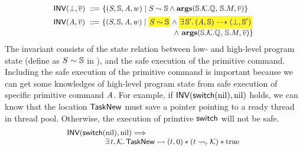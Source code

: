 \[
    \small
    \begin{array}{l}
        \INV{(\primdone, \args{\val})} \ \define \ 
        \{
        (\state, \hpstate, \primcom, \word) \sepline
        \stateRel{\state}{\hpstate}
        \land 
        \arguments(\hpstate.\hthrdlocalst.\hRstate, \,  
        \hpstate.\Mem, \args{\val})
        \} \\
        \\[-8pt]
        \INV{(\primcom, \args{\val})} \ \define \ 
        \{
            (\state, \hpstate, \primcom, \word) \sepline
            \colorbox{yellow!80}{\!$\stateRel{\state}{\hpstate}$\!}
            \land 
            \colorbox{yellow!80}
            {\!\!\!
                $\exists \, \hpstate'. \,
                \primTrans{(\primcom, 
                    \hpstate)}{(\primdone, \hpstate')}$ 
            \!\!\!} \\
            \hspace*{15.8em} 
            \land \
            \arguments(\hpstate.\hthrdlocalst.\hRstate, \,  
            \hpstate.\Mem, \args{\val})
        \}
    \end{array}
\]
The invariant consists of the state relation between low- and 
high-level program state 
(define as ${S} \sim {\mathbb{S}}$ in 
\Fig{\ref{fig:State Relation between Low- and High-level Program State}}), 
and the safe execution of the primitive command. 
Including the safe execution of the primitive command is 
important 
because we can get some knowledges of high-level program 
state from safe execution of specific primitive command $\textit{A}$. 
For example, if $\textsf{INV}{(\mathsf{switch}(\text{nil}), \text{nil})}$
holds, we can know that the location $\mathsf{TaskNew}$ 
must save a pointer pointing to a ready thread
in thread pool.
Otherwise, 
the execution of primtive $\mathsf{switch}$ will not be safe.
\[
    \small
    \begin{array}{l}
        \textsf{INV}{(\mathsf{switch}(\text{nil}), \text{nil})} 
        \Longrightarrow \\ 
        \hspace*{5em}
        \exists \, t, \mathcal{K}. \, 
        {\mathsf{TaskNew}} \rightarrowtail {(t, 0)} 
        * 
        ({t} \leadsto_{\textsf{r}} {\mathcal{K}})
        * \text{true}
    \end{array}
\]
